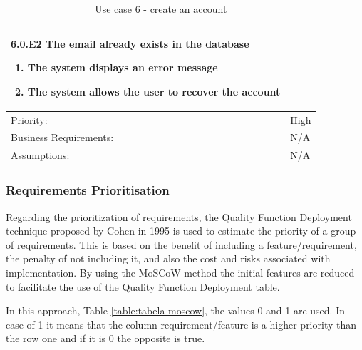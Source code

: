 \begin{table}[H]
\begin{adjustbox}{width=1.2\textwidth,center=\textwidth}
\begin{tabular}{|m{4cm}|m{12cm}|}
\begin{enumerate}
            \end{enumerate}
            \textbf{6.0.E2 The email already exists in the database}
            \begin{enumerate}
                \item The system displays an error message
                \item The system allows the user to recover the account
            \end{enumerate} \\
            \hline
            Priority: & High \\
            \hline
            Business Requirements: & N/A \\
            \hline
            Assumptions: & N/A \\
            \hline
        \end{tabular}
    \end{adjustbox}
    \vspace{1em}
    \caption{Use case 6 - create an account}
    \label{table:use_case6}
\end{table}

\subsubsection{Requirements Prioritisation}

Regarding the prioritization of requirements, the Quality Function Deployment technique
proposed by Cohen in 1995 \cite{cohen1995quality} is used to estimate the priority of a group of requirements.
This is based on the benefit of including a feature/requirement, the penalty of not including
it, and also the cost and risks associated with implementation. By using the MoSCoW method \cite{clegg1994case} the
initial features are reduced to facilitate the use of the Quality Function Deployment table.

In this approach, Table \ref{table:tabela moscow}, the values 0 and 1 are used. In case of 1 it means that the column requirement/feature
is a higher priority than the row one and if it is 0 the opposite is true.


